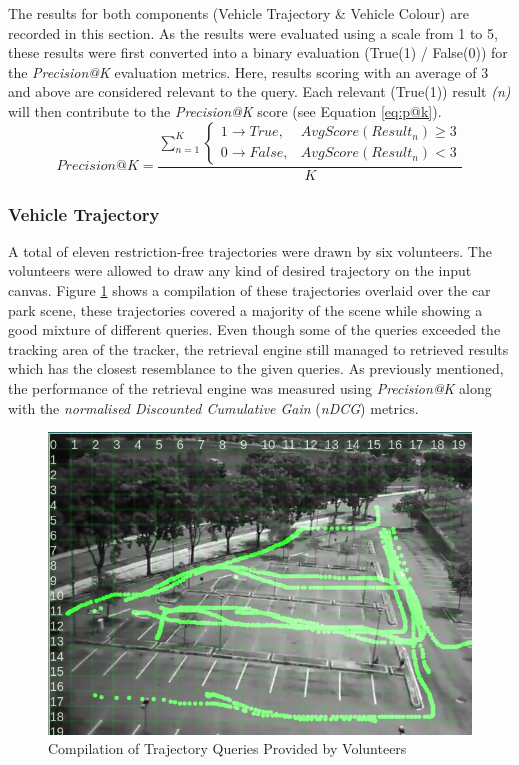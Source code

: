 The results for both components (Vehicle Trajectory \& Vehicle Colour) are
recorded in this section. As the results were evaluated using a scale from 1 to
5, these results were first converted into a binary evaluation (True(1) /
False(0)) for the \textit{Precision@K} evaluation metrics. Here, results scoring with an average of 3 and above are considered relevant to the query. Each relevant (True(1)) result \textit{(n)} will then contribute to the \textit{Precision@K} score (see Equation \ref{eq:p@k}).
 \begin{equation}
\label{eq:p@k}
Precision@K =  \frac{\sum_{n=1}^K \begin{cases}1 \rightarrow True, & AvgScore(Result_n)\geq 3\\0 \rightarrow False, & AvgScore(Result_n)< 3 \end{cases}} {K}
\end{equation}

\subsubsection{Vehicle Trajectory}
A total of eleven restriction-free trajectories were drawn by six volunteers.
The volunteers were allowed to draw any kind of desired trajectory on the input
canvas.
Figure \ref{fig:versionTwoTrajquery} shows a compilation of these trajectories
overlaid over the car park scene, these trajectories covered a majority of the
scene while showing a good mixture of different queries.
Even though some of the queries exceeded the tracking area of the tracker,
the retrieval engine still managed to retrieved results which has the closest
resemblance to the given queries. As previously mentioned, the performance of
the retrieval engine was measured using \textit{Precision@K} along with the
\textit{normalised Discounted Cumulative Gain} (\textit{nDCG}) metrics.

\begin{figure}[!t]
  \centering
    \includegraphics[width=0.8\linewidth]{image/retrievalTwo/trajquery.png}
  \caption{Compilation of Trajectory Queries Provided by Volunteers}
  \label{fig:versionTwoTrajquery}
\end{figure}


